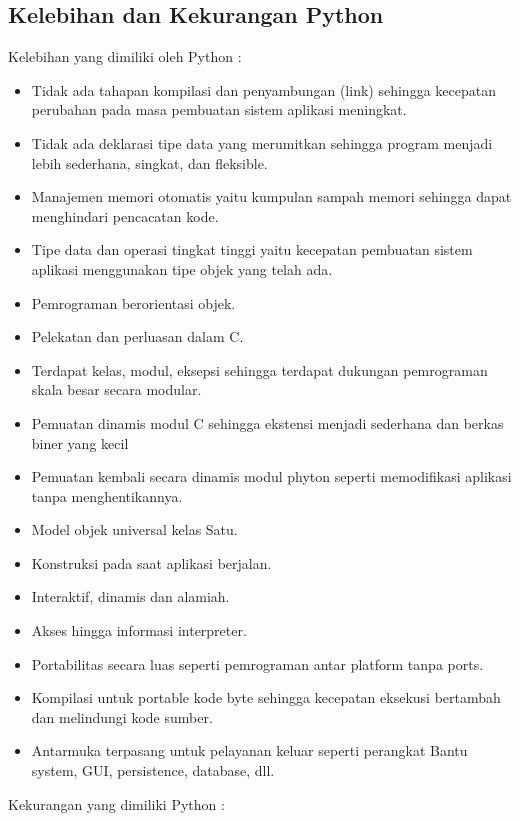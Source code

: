 \subsection{Kelebihan dan Kekurangan Python}
Kelebihan yang dimiliki oleh Python :
	\begin{itemize}
		\item Tidak ada tahapan kompilasi dan penyambungan (link) sehingga kecepatan perubahan pada masa pembuatan sistem aplikasi meningkat. 
		\item Tidak ada deklarasi tipe data yang merumitkan sehingga program menjadi lebih sederhana, singkat, dan ﬂeksible. 
		\item Manajemen memori otomatis yaitu kumpulan sampah memori sehingga dapat menghindari pencacatan kode. 
		\item Tipe data dan operasi tingkat tinggi yaitu kecepatan pembuatan sistem aplikasi menggunakan tipe objek yang telah ada. 
		\item Pemrograman berorientasi objek.
		\item Pelekatan dan perluasan dalam C. 
		\item Terdapat kelas, modul, eksepsi sehingga terdapat dukungan pemrograman skala besar secara modular.
		\item Pemuatan dinamis modul C sehingga ekstensi menjadi sederhana dan berkas biner yang kecil 
		\item Pemuatan kembali secara dinamis modul phyton seperti memodiﬁkasi aplikasi tanpa menghentikannya. 
		\item Model objek universal kelas Satu. 
		\item Konstruksi pada saat aplikasi berjalan.
		\item Interaktif, dinamis dan alamiah. 
		\item Akses hingga informasi interpreter. 
		\item Portabilitas secara luas seperti pemrograman antar platform tanpa ports. 
		\item Kompilasi untuk portable kode byte sehingga kecepatan eksekusi bertambah dan melindungi kode sumber.
		\item Antarmuka terpasang untuk pelayanan keluar seperti perangkat Bantu system, GUI, persistence, database, dll. 
	\end{itemize}
Kekurangan yang dimiliki Python :
